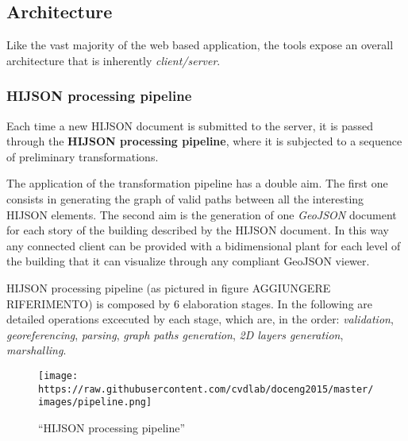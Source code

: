 \documentclass[]{article}
\begin{document}
\subsection{Architecture}\label{architecture}

Like the vast majority of the web based application, the tools expose an
overall architecture that is inherently \emph{client/server}.

\subsubsection{HIJSON processing
pipeline}\label{hijson-processing-pipeline}

Each time a new HIJSON document is submitted to the server, it is passed
through the \textbf{HIJSON processing pipeline}, where it is subjected
to a sequence of preliminary transformations.

The application of the transformation pipeline has a double aim. The
first one consists in generating the graph of valid paths between all
the interesting HIJSON elements. The second aim is the generation of one
\emph{GeoJSON} document for each story of the building described by the
HIJSON document. In this way any connected client can be provided with a
bidimensional plant for each level of the building that it can visualize
through any compliant GeoJSON viewer.

HIJSON processing pipeline (as pictured in figure AGGIUNGERE
RIFERIMENTO) is composed by 6 elaboration stages. In the following are
detailed operations excecuted by each stage, which are, in the order:
\emph{validation}, \emph{georeferencing}, \emph{parsing}, \emph{graph
paths generation}, \emph{2D layers generation}, \emph{marshalling}.

\begin{figure}[htbp]
\centering
\texttt{[image: https://raw.githubusercontent.com/cvdlab/doceng2015/master/images/pipeline.png]}
\caption{``HIJSON processing pipeline''}
\end{figure}
\end{document}
